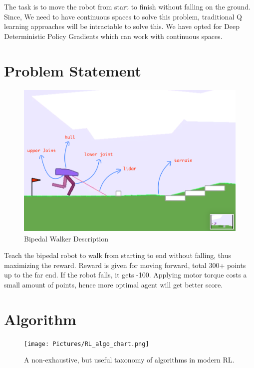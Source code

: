 \documentclass[a4paper]{article}
\begin{document}
The task is to move the robot from start to finish without falling on the ground. Since, We need to have continuous spaces to solve this problem, traditional Q learning approaches will be intractable to solve this. We have opted for Deep Deterministic Policy Gradients which can work with continuous spaces. 

\section*{Problem Statement}

\begin{figure}
\centering
\includegraphics[width=150mm,height=75mm]{Pictures/bipedal.png}
\caption{Bipedal Walker Description\cite{bipedal_pic:2019}}
\label{bipedal}
\end{figure}

Teach the bipedal robot to walk from starting to end without falling, thus maximizing the reward. Reward is given for moving forward, total 300+ points up to the far end. If the robot falls, it gets -100. Applying motor torque costs a small amount of points, hence more optimal agent will get better score. 

\section*{Algorithm}

\begin{figure}
\centering
\texttt{[image: Pictures/RL\_algo\_chart.png]}
\caption{A non-exhaustive, but useful taxonomy of algorithms in modern RL.\cite{rl_intro2:2019}}
\label{chart}
\end{figure}
\end{document}
